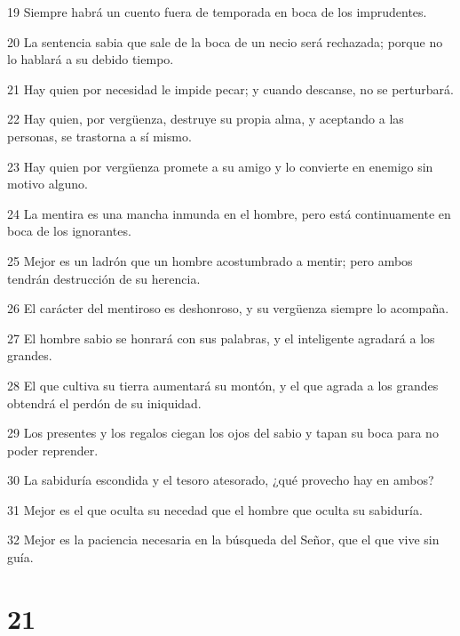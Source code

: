 \par 19 Siempre habrá un cuento fuera de temporada en boca de los imprudentes.
\par 20 La sentencia sabia que sale de la boca de un necio será rechazada; porque no lo hablará a su debido tiempo.
\par 21 Hay quien por necesidad le impide pecar; y cuando descanse, no se perturbará.
\par 22 Hay quien, por vergüenza, destruye su propia alma, y ​​aceptando a las personas, se trastorna a sí mismo.
\par 23 Hay quien por vergüenza promete a su amigo y lo convierte en enemigo sin motivo alguno.
\par 24 La mentira es una mancha inmunda en el hombre, pero está continuamente en boca de los ignorantes.
\par 25 Mejor es un ladrón que un hombre acostumbrado a mentir; pero ambos tendrán destrucción de su herencia.
\par 26 El carácter del mentiroso es deshonroso, y su vergüenza siempre lo acompaña.
\par 27 El hombre sabio se honrará con sus palabras, y el inteligente agradará a los grandes.
\par 28 El que cultiva su tierra aumentará su montón, y el que agrada a los grandes obtendrá el perdón de su iniquidad.
\par 29 Los presentes y los regalos ciegan los ojos del sabio y tapan su boca para no poder reprender.
\par 30 La sabiduría escondida y el tesoro atesorado, ¿qué provecho hay en ambos?
\par 31 Mejor es el que oculta su necedad que el hombre que oculta su sabiduría.
\par 32 Mejor es la paciencia necesaria en la búsqueda del Señor, que el que vive sin guía.

\chapter{21}

